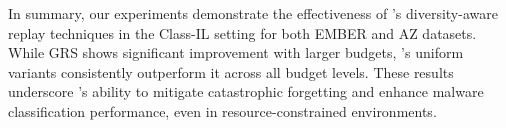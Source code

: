 In summary, our experiments demonstrate the effectiveness of \system's diversity-aware replay techniques in the Class-IL setting for both EMBER and AZ datasets. While GRS shows significant improvement with larger budgets, \system's uniform variants consistently outperform it across all budget levels. These results underscore \system's ability to mitigate catastrophic forgetting and enhance malware classification performance, even in resource-constrained environments.
















